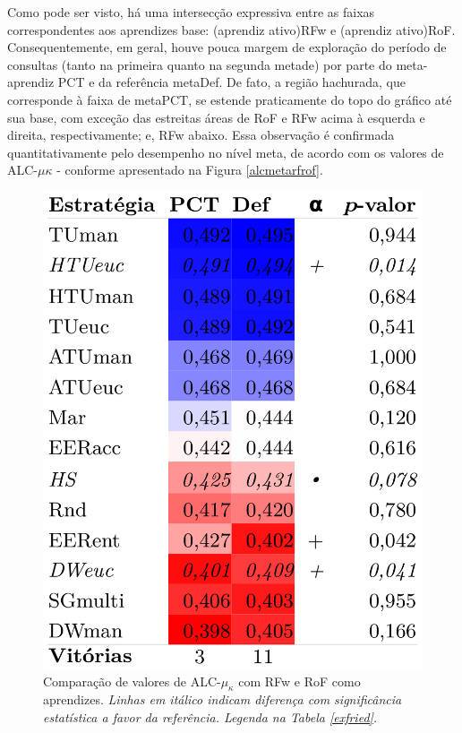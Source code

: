 Como pode ser visto, há uma intersecção expressiva entre as faixas correspondentes aos aprendizes base: (aprendiz ativo)RFw e (aprendiz ativo)RoF.
Consequentemente, em geral, houve pouca margem de exploração do período de consultas (tanto na primeira quanto na segunda metade) por parte do meta-aprendiz PCT e da referência metaDef.
De fato, a região hachurada, que corresponde à faixa de metaPCT, se estende praticamente do topo do gráfico até sua base, com exceção das estreitas áreas de RoF e RFw acima à esquerda e direita, respectivamente; e, RFw abaixo.
Essa observação é confirmada quantitativamente pelo desempenho no nível meta,
de acordo com os valores de ALC-$\mu\kappa$ - conforme apresentado na Figura \ref{alcmetarfrof}.
\begin{figure}
\centering
\includegraphics[scale=0.4]{images/metaalcrfrof.pdf}
\caption[Comparação de valores de ALC-$\mu_{\kappa}$ com RFw e RoF como aprendizes.]{Comparação de valores de ALC-$\mu_{\kappa}$ com RFw e RoF como aprendizes.
\textit{Linhas em itálico indicam diferença com significância estatística a favor da referência. Legenda na Tabela \ref{exfried}.}}

\end{figure}
